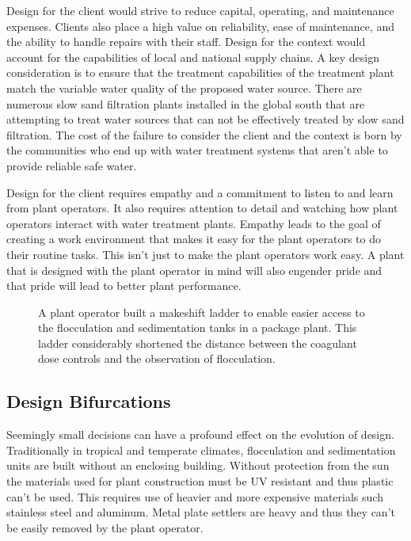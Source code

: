 \documentclass[letterpaper,10pt,english]{sphinxmanual}
\let\sphinxpxdimen\pdfpxdimen\else\newdimen\sphinxpxdimen
\begin{document}
Design for the client would strive to reduce capital, operating, and maintenance expenses. Clients also place a high value on reliability, ease of maintenance, and the ability to handle repairs with their staff. Design for the context would account for the capabilities of local and national supply chains. A key design consideration is to ensure that the treatment capabilities of the treatment plant match the variable water quality of the proposed water source. There are numerous slow sand filtration plants installed in the global south that are attempting to treat water sources that can not be effectively treated by slow sand filtration. The cost of the failure to consider the client and the context is born by the communities who end up with water treatment systems that aren’t able to provide reliable safe water.

Design for the client requires empathy and a commitment to listen to and learn from plant operators. It also requires attention to detail and watching how plant operators interact with water treatment plants. Empathy leads to the goal of creating a work environment that makes it easy for the plant operators to do their routine tasks. This isn’t just to make the plant operators work easy. A plant that is designed with the plant operator in mind will also engender pride and that pride will lead to better plant performance.

\begin{figure}[htbp]
\centering
\capstart

\noindent\sphinxincludegraphics[width=300\sphinxpxdimen]{{Improvised_ladder_access_to_sed_tank}.jpg}
\caption{A plant operator built a makeshift ladder to enable easier access to the flocculation and sedimentation tanks in a package plant. This ladder considerably shortened the distance between the coagulant dose controls and the observation of flocculation.}\label{\detokenize{Introduction/Introduction:id18}}\label{\detokenize{Introduction/Introduction:figure}}\end{figure}


\subsection{Design Bifurcations}
\label{\detokenize{Introduction/Introduction:design-bifurcations}}\label{\detokenize{Introduction/Introduction:heading-design-bifurcations}}
Seemingly small decisions can have a profound effect on the evolution of design. Traditionally in tropical and temperate climates, flocculation and sedimentation units are built without an enclosing building. Without protection from the sun the materials used for plant construction must be UV resistant and thus plastic can’t be used. This requires use of heavier and more expensive materials such stainless steel and aluminum. Metal plate settlers are heavy and thus they can’t be easily removed by the plant operator.
\end{document}
